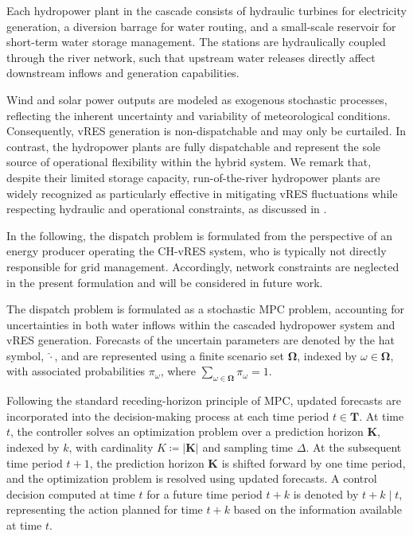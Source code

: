 \documentclass[a4paper,fleqn]{cas-sc}
\begin{document}
Each hydropower plant in the cascade consists of hydraulic turbines for electricity generation, a diversion barrage for water routing, and a small-scale reservoir for short-term water storage management.
The stations are hydraulically coupled through the river network, such that upstream water releases directly affect downstream inflows and generation capabilities.

Wind and solar power outputs are modeled as exogenous stochastic processes, reflecting the inherent uncertainty and variability of meteorological conditions.
Consequently, vRES generation is non-dispatchable and may only be curtailed.
In contrast, the hydropower plants are fully dispatchable and represent the sole source of operational flexibility within the hybrid system.
We remark that, despite their limited storage capacity, run-of-the-river hydropower plants are widely recognized as particularly effective in mitigating vRES fluctuations while respecting hydraulic and operational constraints, as discussed in \cite{piron2016operating}.

In the following, the dispatch problem is formulated from the perspective of an energy producer operating the CH-vRES system, who is typically not directly responsible for grid management. 
Accordingly, network constraints are neglected in the present formulation and will be considered in future work.

The dispatch problem is formulated as a stochastic MPC problem, accounting for uncertainties in both water inflows within the cascaded hydropower system and vRES generation.
Forecasts of the uncertain parameters are denoted by the hat symbol, $\hat{\cdot}$,
and are represented using a finite scenario set $\boldsymbol{\Omega}$, indexed by $\omega \in \boldsymbol{\Omega}$,
with associated probabilities $\pi_{\omega}$, where $\sum_{\omega \in \boldsymbol{\Omega}} \pi_{\omega} = 1$.

Following the standard receding-horizon principle of MPC, updated forecasts are incorporated into the decision-making process at each time period $t \in \boldsymbol{T}$.
At time $t$, the controller solves an optimization problem over a prediction horizon $\boldsymbol{K}$, indexed by $k$, with cardinality $K \coloneqq |\boldsymbol{K}|$ and sampling time $\Delta$.
At the subsequent time period $t+1$, the prediction horizon $\boldsymbol{K}$ is shifted forward by one time period, and the optimization problem is resolved using updated forecasts.
A control decision computed at time $t$ for a future time period $t+k$ is denoted by $t+k \mid t$, representing the action planned for time $t+k$ based on the information available at time $t$.
\end{document}
